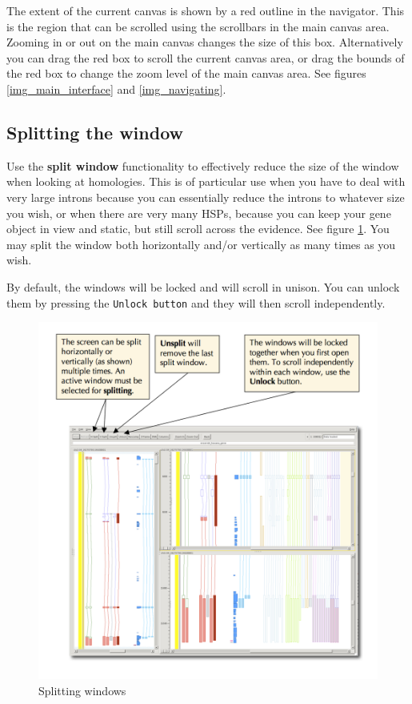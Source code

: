\documentclass[letterpaper]{article}
\begin{document}
The extent of the current canvas is shown by a red outline in the navigator. This is the region that can be scrolled using the scrollbars in the main canvas area. Zooming in or out on the main canvas changes the size of this box. Alternatively you can drag the red box to scroll the current canvas area, or drag the bounds of the red box to change the zoom level of the main canvas area. See figures \ref{img_main_interface} and \ref{img_navigating}.


\subsection{Splitting the window} \label{sec_split}
Use the \textbf{split window} functionality to effectively reduce the size of the window when looking at homologies. This is of particular use when you have to deal with very large introns because you can essentially reduce the introns to whatever size you wish, or when there are very many HSPs, because you can keep your gene object in view and static, but still scroll across the evidence. See figure \ref{img_split_window}. You may split the window both horizontally and/or vertically as many times as you wish.

By default, the windows will be locked and will scroll in unison. You can unlock them by pressing the \lstinline{Unlock button} and they will then scroll independently.

\begin{figure}
\centering
\color[rgb]{0.30980393,0.5058824,0.7411765}
\includegraphics[width=15.231cm]{images/split_window.png}
\caption{Splitting windows}
\label{img_split_window}
\end{figure}
\end{document}
